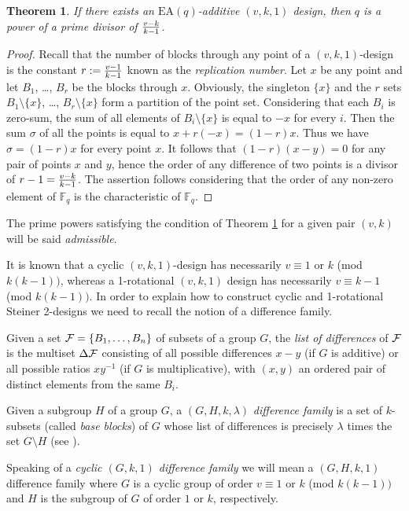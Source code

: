 \documentclass[a4paper, 11pt]{article}
\newtheorem{theorem}{Theorem}[section]
\theoremstyle{definition}
\theoremstyle{definition}
\theoremstyle{definition}
\newcommand{\F}{\mathbb{F}}
\numberwithin{equation}{section}
\begin{document}
\begin{theorem}\label{admissible}
If there exists an $\mathrm{EA}(q)$-additive $(v,k,1)$ design, then $q$ is a power of a
prime  divisor of ${v-k\over k-1}$.
\end{theorem}
\begin{proof}
Recall that the number of blocks through any point of a $(v,k,1)$-design is the constant $r:={v-1\over k-1}$
known as the {\it replication number}.
Let $x$ be any point and let $B_1$, \dots, $B_r$ be the blocks through $x$.
Obviously, the singleton $\{x\}$ and the $r$ sets $B_1\setminus\{x\}$, \dots, $B_r\setminus\{x\}$ form a partition of the point set.
Considering that each $B_i$ is zero-sum, the sum of all elements of $B_i\setminus\{x\}$ is equal to $-x$ for every $i$. Then the
sum $\sigma$ of all the points is equal to $x+r(-x)=(1-r)x$. Thus we have $\sigma=(1-r)x$ for every point $x$. 
It follows that $(1-r)(x-y)=0$ for any pair of points $x$ and $y$, hence the order of any difference of two points
is a divisor of $r-1={v-k\over k-1}$. The assertion follows considering that the order of any non-zero element of $\F_q$ 
is the characteristic of $\F_q$. 
\end{proof}

The prime powers satisfying the condition of Theorem \ref{admissible} for a given pair $(v,k)$ will be said {\it admissible}.

\medskip
It is known that a cyclic $(v,k,1)$-design has necessarily $v\equiv 1$ or $k$ (mod $k(k-1))$,
whereas a 1-rotational $(v,k,1)$ design has necessarily $v\equiv k-1$ (mod $k(k-1))$.
In order to explain how to construct cyclic and 1-rotational Steiner 2-designs we need to recall the
notion of a difference family.

Given a set ${\cal F}=\{B_1,\dots,B_n\}$ of subsets of a group $G$, the {\it list of differences} of $\cal F$
is the multiset $\Delta{\cal F}$ consisting of all possible differences $x-y$ (if $G$ is additive) or all possible
ratios $xy^{-1}$ (if $G$ is multiplicative), with $(x,y)$ an ordered pair of distinct elements from the same $B_i$.

Given a subgroup $H$ of a group $G$, a $(G,H,k,\lambda)$ {\it difference family} is a set of $k$-subsets (called {\it base blocks})
of $G$ whose list of differences is precisely $\lambda$ times the set $G\setminus H$ (see \cite{B}). 

Speaking of a {\it cyclic $(G,k,1)$ difference family} we will mean a $(G,H,k,1)$ difference family where $G$ is a cyclic group
of order $v\equiv1$ or $k$ (mod $k(k-1))$ and $H$ is the subgroup of $G$ of order $1$ or $k$, respectively.
\end{document}
